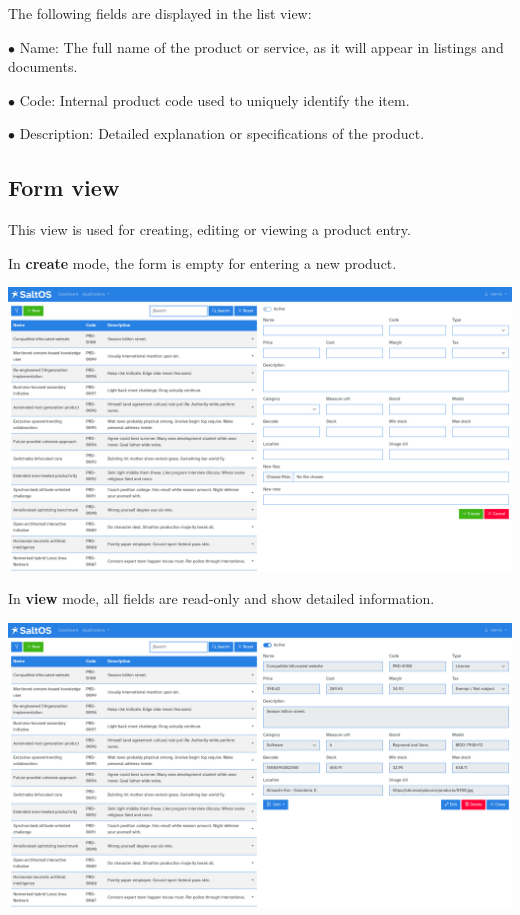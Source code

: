 \documentclass[a4paper]{article}
\begin{document}
The following fields are displayed in the list view:

\begin{compactitem}
\item[\color{myblue}$\bullet$] Name: The full name of the product or service, as it will appear in listings and documents.
\item[\color{myblue}$\bullet$] Code: Internal product code used to uniquely identify the item.
\item[\color{myblue}$\bullet$] Description: Detailed explanation or specifications of the product.
\end{compactitem}

\hypertarget{toc154}{}
\subsection{Form view}

This view is used for creating, editing or viewing a product entry.

In \textbf{create} mode, the form is empty for entering a new product.

\begin{center}\includegraphics[width=1\textwidth]{../ujest/snaps/test-screenshots-js-screenshots-sales-products-create-en-us-1-snap.png}\end{center}

In \textbf{view} mode, all fields are read-only and show detailed information.

\begin{center}\includegraphics[width=1\textwidth]{../ujest/snaps/test-screenshots-js-screenshots-sales-products-view-100-en-us-1-snap.png}\end{center}
\end{document}
